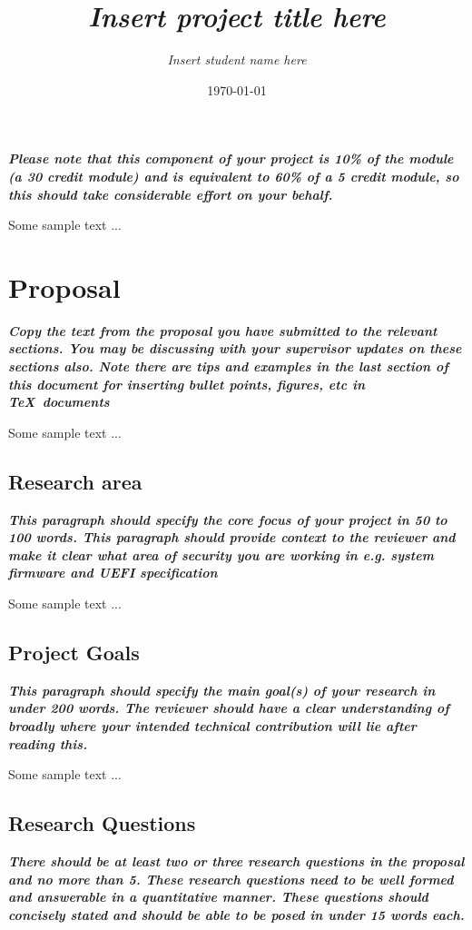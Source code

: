 \documentclass{article} %
\title{\emph{Insert project title here}}  %
\author{\emph{Insert student name here}} %
\date{\today}
\newcommand{\hint}[1] {\par {\bfseries \color{Blue} \it #1 \par}}
\begin{document}
\maketitle
\hint{Please note that this component of your project is 10\% of the module (a 30 credit module) and is equivalent to 60\% of a 5 credit module, so this should take considerable effort on your behalf.}
Some sample text ...

\section{Proposal}
\hint{Copy the text from the proposal you have submitted to the relevant sections. You may be discussing with your supervisor updates on these sections also. Note there are tips and examples in the last section of this document for inserting bullet points, figures, etc in \TeX\ documents}

Some sample text ...

\subsection{Research area}
\hint{This paragraph should specify the core focus of your project in 50 to 100 words. This paragraph should provide context to the reviewer and make it clear what area of security you are working in e.g. system firmware and UEFI specification}

Some sample text ...

\subsection{Project Goals}
\hint{This paragraph should specify the main goal(s) of your research in under 200 words. The reviewer should have a clear understanding of broadly where your intended technical contribution will lie after reading this.}

Some sample text ...

\subsection{Research Questions}
\hint{There should be at least two or three research questions in the proposal and no more than 5. These research questions need to be well formed and answerable in a quantitative manner. These questions should concisely stated and should be able to be posed in under 15 words each.}
\end{document}
